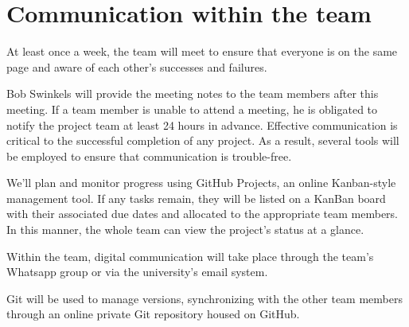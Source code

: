 \section{Communication within the team}

At least once a week, the team will meet to ensure that everyone is on the same page and aware of each other's successes and failures.

Bob Swinkels will provide the meeting notes to the team members after this meeting. If a team member is unable to attend a meeting, he is obligated to notify the project team at least 24 hours in advance.
Effective communication is critical to the successful completion of any project. As a result, several tools will be employed to ensure that communication is trouble-free.

We'll plan and monitor progress using GitHub Projects, an online Kanban-style management tool. If any tasks remain, they will be listed on a KanBan board with their associated due dates and allocated to the appropriate team members. In this manner, the whole team can view the project's status at a glance. 

Within the team, digital communication will take place through the team's Whatsapp group or via the university's email system. 

Git will be used to manage versions, synchronizing with the other team members through an online private Git repository housed on GitHub.